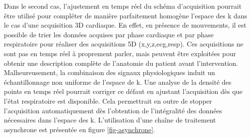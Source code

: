 

Dans le second cas, l’ajustement en temps réel du schéma d’acquisition pourrait être utilisé pour compléter de manière parfaitement homogène l’espace des k dans le cas d’une acquisition 3D cardiaque. En effet, en présence de mouvements, il est possible de trier les données acquises par phase cardiaque et par phase respiratoire pour réaliser des acquisitions 5D (x,y,z,ecg,resp). Ces acquisitions ne sont pas en temps réel à proprement parler, mais peuvent être exploitées pour obtenir une description complète de l’anatomie du patient avant l’intervention. Malheureusement, la combinaison des signaux physiologiques induit un échantillonnage non uniforme de l’espace de k. Une analyse de la densité des points en temps réel pourrait corriger ce défaut en ajustant l’acquisition dès que l’état respiratoire est disponible. Cela permettrait en outre de stopper l’acquisition automatiquement dès l’obtention de l’intégralité des données nécessaires dans l’espace des k. L’utilisation d’une chaîne de traitement asynchrone est présentée en figure \ref{fig-asynchrone}.\\
